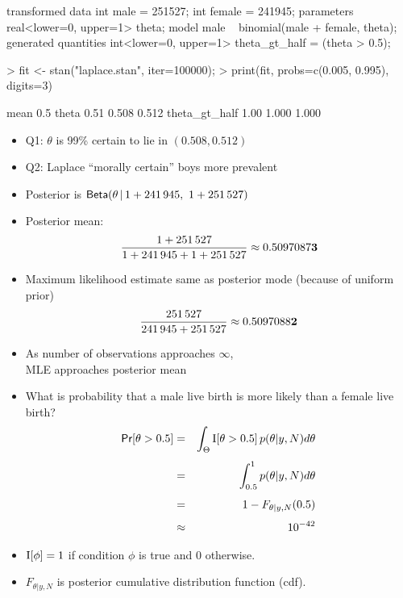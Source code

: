 \documentclass[10pt]{report}
\begin{document}
\begin{stancode}
transformed data {
  int male = 251527;
  int female = 241945;
}
parameters {
  real<lower=0, upper=1> theta;
}
model {
  male ~ binomial(male + female, theta);
}
generated quantities {
  int<lower=0, upper=1> theta_gt_half = (theta > 0.5);
}
\end{stancode}


%
\begin{codein}
> fit <- stan("laplace.stan", iter=100000);
> print(fit, probs=c(0.005, 0.995), digits=3)
\end{codein}
\begin{codeout}
                    mean   0.5%
theta               0.51  0.508  0.512
theta_gt_half       1.00  1.000  1.000
\end{codeout}
%
\begin{itemize}
\item Q1: $\theta$ is 99\% certain to lie in $(0.508, 0.512)$
%
\item Q2:  Laplace ``morally certain'' boys more prevalent
\end{itemize}


%
\begin{itemize}
\item Posterior is $\text{\sf Beta}(\theta \, | \, 1 + 241\,945, \ 1 + 251\,527)$
\item Posterior mean:
\[
\frac{1 + 251\,527}
     {1 + 241\,945 + 1 + 251\,527}
\approx 0.5097087{\bf3}
\]
\item Maximum likelihood estimate same as posterior mode (because
  of uniform prior)
\[
\frac{251\,527}
     {241\,945 + 251\,527}
\approx 0.5097088{\bf2}
\]
\item As number of observations approaches $\infty$,
\\
MLE approaches posterior mean
\end{itemize}


%
\begin{itemize}
\item What is probability that a male live birth is more likely than a
  female live birth?
\begin{eqnarray*}
\text{\sf Pr}[\theta > 0.5]
& = &  \int_{\Theta} \text{I}[\theta > 0.5] \, p(\theta|y,N) d\theta
\\[4pt]
& = &  \int_{0.5}^1 p(\theta|y,N) d\theta
\\[4pt]
& = &  1 - F_{\theta|y,N}(0.5)
\\[4pt]
& \approx &  10^{-42}
\end{eqnarray*}
\item $\text{I}[\phi] = 1$ if condition $\phi$ is true and 0 otherwise.
\item  $F_{\theta|y,N}$ is posterior cumulative distribution
function (cdf).
\end{itemize}
\end{document}
